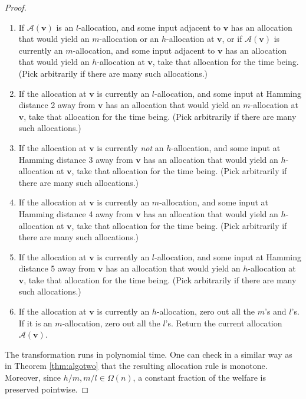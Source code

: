 \documentclass[runningheads,a4paper]{llncs}
\begin{document}
\begin{proof}
\begin{enumerate}
\item If $\mathcal{A}(\textbf{v})$ is an $l$-allocation, and some input adjacent to $\textbf{v}$ has an allocation that would yield an $m$-allocation or an $h$-allocation at $\textbf{v}$, or if $\mathcal{A}(\textbf{v})$ is currently an $m$-allocation, and some input adjacent to $\textbf{v}$ has an allocation that would yield an $h$-allocation at $\textbf{v}$, take that allocation for the time being. (Pick arbitrarily if there are many such allocations.)
\item If the allocation at $\textbf{v}$ is currently an $l$-allocation, and some input at Hamming distance 2 away from $\textbf{v}$ has an allocation that would yield an $m$-allocation at $\textbf{v}$, take that allocation for the time being.  (Pick arbitrarily if there are many such allocations.)
\item If the allocation at $\textbf{v}$ is currently \emph{not} an $h$-allocation, and some input at Hamming distance 3 away from $\textbf{v}$ has an allocation that would yield an $h$-allocation at $\textbf{v}$, take that allocation for the time being. (Pick arbitrarily if there are many such allocations.)
\item If the allocation at $\textbf{v}$ is currently an $m$-allocation, and some input at Hamming distance 4 away from $\textbf{v}$ has an allocation that would yield an $h$-allocation at $\textbf{v}$, take that allocation for the time being. (Pick arbitrarily if there are many such allocations.) 
\item If the allocation at $\textbf{v}$ is currently an $l$-allocation, and some input at Hamming distance 5 away from $\textbf{v}$ has an allocation that would yield an $h$-allocation at $\textbf{v}$, take that allocation for the time being. (Pick arbitrarily if there are many such allocations.)
\item If the allocation at $\textbf{v}$ is currently an $h$-allocation, zero out all the $m$'s and $l$'s. If it is an $m$-allocation, zero out all the $l$'s. Return the current allocation $\mathcal{A}(\textbf{v})$.
\end{enumerate}
The transformation runs in polynomial time. One can check in a similar way as in Theorem \ref{thm:algotwo} that the resulting allocation rule is monotone. Moreover, since $h/m,m/l\in\Omega(n)$, a constant fraction of the welfare is preserved pointwise.


\end{proof}
\end{document}
